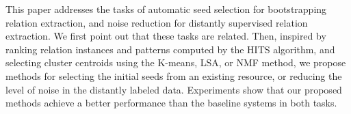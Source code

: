 This paper addresses the tasks of automatic seed selection for bootstrapping relation extraction, and noise reduction for distantly supervised relation extraction. We first point out that these tasks are related. Then, inspired by ranking relation instances and patterns computed by the HITS algorithm, and selecting cluster centroids using the K-means, LSA, or NMF method, we propose methods for selecting the initial seeds from an existing resource, or reducing the level of noise in the distantly labeled data. Experiments show that our proposed methods achieve a better performance than the baseline systems in both tasks.
